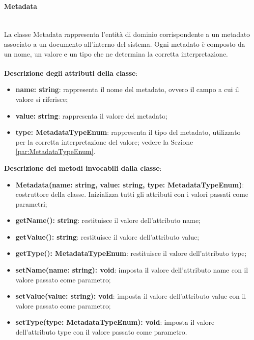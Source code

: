 \documentclass[a4paper,12pt]{article}
\begin{document}
{                \paragraph{Metadata}\label{par:Metadata}\mbox{}\\
                La classe Metadata rappresenta l'entità di dominio corrispondente a un metadato associato a un documento all'interno del sistema. Ogni metadato è composto da un nome, un valore e un tipo che ne determina la corretta interpretazione.\\
                \\
                \textbf{Descrizione degli attributi della classe}:
                \begin{itemize}
                    \item \textbf{name: string}: rappresenta il nome del metadato, ovvero il campo a cui il valore si riferisce;
                    \item \textbf{value: string}: rappresenta il valore del metadato;
                    \item \textbf{type: MetadataTypeEnum}: rappresenta il tipo del metadato, utilizzato per la corretta interpretazione del valore; vedere la Sezione \ref{par:MetadataTypeEnum}.
                \end{itemize}
 
              \noindent \textbf{Descrizione dei metodi invocabili dalla classe}:
                \begin{itemize}
                    \item \textbf{Metadata(name: string, value: string, type: MetadataTypeEnum)}: costruttore della classe. Inizializza tutti gli attributi con i valori passati come parametri;
                    \item \textbf{getName(): string}: restituisce il valore dell'attributo name;
                    \item \textbf{getValue(): string}: restituisce il valore dell'attributo value;
                    \item \textbf{getType(): MetadataTypeEnum}: restituisce il valore dell'attributo type;
                    \item \textbf{setName(name: string): void}: imposta il valore dell'attributo name con il valore passato come parametro;
                    \item \textbf{setValue(value: string): void}: imposta il valore dell'attributo value con il valore passato come parametro;
                    \item \textbf{setType(type: MetadataTypeEnum): void}: imposta il valore dell'attributo type con il valore passato come parametro.
                \end{itemize}
 
}
\end{document}
